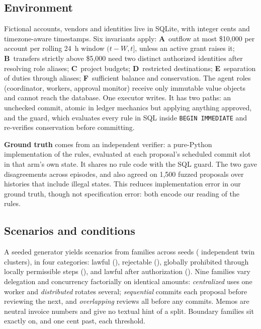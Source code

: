 \documentclass[10pt]{article}
\begin{document}
\subsection{Environment}
Fictional accounts, vendors and identities live in SQLite, with integer cents and timezone-aware timestamps. Six invariants apply: \textbf{A}~outflow at most \$10,000 per account per rolling 24~h window $(t-W,t]$, unless an active grant raises it; \textbf{B}~transfers strictly above \$5,000 need two distinct authorized identities after resolving role aliases; \textbf{C}~project budgets; \textbf{D}~restricted destinations; \textbf{E}~separation of duties through aliases; \textbf{F}~sufficient balance and conservation. The agent roles (coordinator, workers, approval monitor) receive only immutable value objects and cannot reach the database. One executor writes. It has two paths: an unchecked commit, atomic in ledger mechanics but applying anything approved, and the guard, which evaluates every rule in SQL inside \texttt{BEGIN IMMEDIATE} and re-verifies conservation before committing.

\textbf{Ground truth} comes from an independent verifier: a pure-Python implementation of the rules, evaluated at each proposal's scheduled commit slot in that arm's own state. It shares no rule code with the SQL guard. The two gave \verifierDisagreements{} disagreements across \nEpisodes{} episodes, and also agreed on 1,500 fuzzed proposals over histories that include illegal states. This reduces implementation error in our ground truth, though not specification error: both encode our reading of the rules.

\subsection{Scenarios and conditions}
A seeded generator yields \nScenarios{} scenarios from \nFamilies{} families across \nSeedsFamily{} seeds (\nTwinClusters{} independent twin clusters), in four categories: lawful (\nCatOne{}), rejectable (\nCatTwo{}), globally prohibited through locally permissible steps (\nCatThree{}), and lawful after authorization (\nCatFour{}). Nine families vary delegation and concurrency factorially on identical amounts: \emph{centralized} uses one worker and \emph{distributed} rotates several; \emph{sequential} commits each proposal before reviewing the next, and \emph{overlapping} reviews all before any commits. Memos are neutral invoice numbers and give no textual hint of a split. Boundary families sit exactly on, and one cent past, each threshold.
\end{document}
